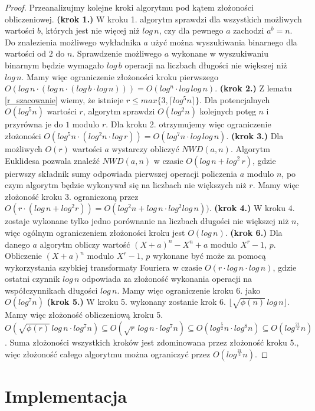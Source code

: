 \documentclass[declaration,shortabstract]{iithesis}
\theoremstyle{definition}
\theoremstyle{remark} \newtheorem{observation}{Obserwacja}
\theoremstyle{plain} \newtheorem{theorem}{Twierdzenie}
\theoremstyle{plain} \newtheorem{lemma}{Lemat}
\theoremstyle{remark} \newtheorem*{remark*}{Uwaga}
\theoremstyle{reminder} \newtheorem*{reminder*}{Przypomnienie}
\begin{document}
\begin{proof}
	Przeanalizujmy kolejne kroki algorytmu pod kątem złożoności obliczeniowej. \newline
	\textbf{(krok 1.)} W kroku 1. algorytm sprawdzi dla wszystkich możliwych wartości $b$, których jest nie więcej niż $log\,n$, czy dla pewnego $a$ zachodzi $a^b = n$. Do znalezienia możliwego wykładnika $a$ użyć można wyszukiwania binarnego dla wartości od $2$ do $n$. Sprawdzenie możliwego $a$ wykonane w wyszukiwaniu binarnym będzie wymagało $log \, b$ operacji na liczbach długości nie większej niż $log \, n$. Mamy więc ograniczenie złożoności kroku pierwszego $O(log \, n \cdot (log \,n \cdot (log \,b \cdot log \,n ))) = O(log^n \cdot log \, log \, n)$.\newline
	\textbf{(krok 2.)} Z lematu \ref{r_szacowanie} wiemy, że istnieje $r \leq max\{3, \lceil log^5n \rceil \}$. Dla potencjalnych $O(log^5n)$ wartości $r$, algorytm sprawdzi $O(log^2n)$ kolejnych potęg $n$ i przyrówna je do $1$ modulo $r$. Dla kroku 2. otrzymujemy więc ograniczenie złożoności $O(log^5n \cdot (log^2n \cdot log \,r)) = O(log^7n \cdot log\,log \,n)$. \newline
	\textbf{(krok 3.)} Dla możliwych $O(r)$ wartości $a$ wystarczy obliczyć $NWD(a, n)$. Algorytm Euklidesa pozwala znaleźć $NWD(a, n)$ w czasie $O(log \,n + log ^2 \, r)$, gdzie pierwszy składnik sumy odpowiada pierwszej operacji policzenia $a$ modulo $n$, po czym algorytm będzie wykonywał się na liczbach nie większych niż $r$. Mamy więc złożoność kroku 3. ograniczoną przez $O(r \cdot (log \, n + log^2r)) = O(log^2n + log\,n \cdot log^2log \, n))$. \newline
	\textbf{(krok 4.)} W kroku 4. zostaje wykonane tylko jedno porównanie na liczbach długości nie większej niż $n$, więc ogólnym ograniczeniem złożoności kroku jest $O(log\,n)$.\newline
	\textbf{(krok 6.)} Dla danego $a$ algorytm obliczy wartość $(X + a)^n - X^n + a$ modulo $X^r - 1, \, p$. Obliczenie $(X + a)^n$ modulo $X^r - 1, \, p$ wykonane być może za pomocą wykorzystania szybkiej transformaty Fouriera w czasie $O(r \cdot log \, n \cdot log \, n)$, gdzie ostatni czynnik $log \, n$ odpowiada za złożoność wykonania operacji na współczynnikach długości $log \, n$. Mamy więc ograniczenie kroku 6. jako $O(log^7n)$
	\textbf{(krok 5.)} W kroku 5. wykonany zostanie krok 6. $\lfloor \sqrt{\phi(n)} \, log \, n \rfloor$. Mamy więc złożoność obliczeniową kroku 5. $O(\sqrt{\phi(r)} \, log \, n \cdot log^7n) \subseteq O(\sqrt{r} \, log \, n \cdot log^7n) \subseteq O(log^{\frac{5}{2}}n \cdot log^8n) \subseteq O(log^{\frac{21}{2}}n)$.\newline
	\newline
	Suma złożoności wszystkich kroków jest zdominowana przez złożoność kroku 5., więc złożoność całego algorytmu można ograniczyć przez $O(log^{\frac{21}{2}}n)$.
					
					
\end{proof}
	
\chapter{Implementacja}
	

\end{document}
